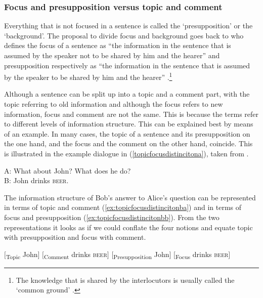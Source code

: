 \subsubsection{Focus and presupposition versus topic and comment}
Everything that is not focused in a sentence is called the `presupposition' or the `background'. The proposal to divide focus and background goes back to \citet{jackendoff1972semantic} who defines the focus of a sentence as ``the information in the sentence that is assumed by the speaker not to be shared by him and the hearer'' and presupposition respectively as ``the information in the sentence that is assumed by the speaker to be shared by him and the hearer'' \citep[230]{jackendoff1972semantic}.\footnote{The knowledge that is shared by the interlocutors is usually called the `common ground' \citep{stalnaker1978assertion}.}

Although a sentence can be split up into a topic and a comment part, with the topic referring to old information and although the focus refers to new information, focus and comment are not the same. This is because the terms refer to different levels of information structure. This can be explained best by means of an example. In many cases, the topic of a sentence and its presupposition on the one hand, and the focus and the comment on the other hand, coincide. This is illustrated in the example dialogue in (\ref{topicfocusdistincitona}), taken from \citet[467]{vallduvi1996linguistic}.
\newpage

\begin{exe}
\ex\label{topicfocusdistincitona}
A: What about John? What does he do? \\
B: John drinks \textsc{beer}.
\end{exe}

\noindent The information structure of Bob's answer to Alice's question can be represented in terms of topic and comment (\ref{ex:topicfocusdistincitonba}) and in terms of focus and presupposition (\ref{ex:topicfocusdistincitonbb}). From the two representations it looks as if we could conflate the four notions and equate topic with presupposition and focus with comment.

\begin{exe}
\ex\label{topicfocusdistincitonb}\begin{xlist}
\ex $[$\textsubscript{Topic} John$]$ $[$\textsubscript{Comment} drinks \textsc{beer}$]$ \label{ex:topicfocusdistincitonba}
\ex $[$\textsubscript{Presupposition} John$]$ $[$\textsubscript{Focus} drinks \textsc{beer}$]$ \label{ex:topicfocusdistincitonbb}
\end{xlist}
\end{exe}

